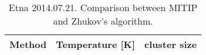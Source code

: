 \begin{table}[!ht]
\caption{Etna 2014.07.21. Comparison between MITIP and Zhukov's algorithm.}
\centering
\begin{tabular}{l|l|l}
\hline\hline
\textbf{Method} & \textbf{Temperature [K]} & \textbf{cluster size} \\
\hline\hline
\end{tabular}
\label{Etna_comp}
\end{table}






